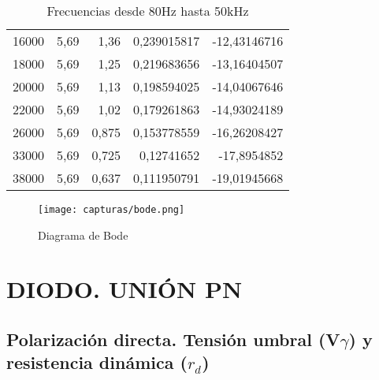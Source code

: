 \begin{itemize}
\begin{table}[htbp]
\begin{tabular}{rrrrr}
				16000 & 5,69  & 1,36  & 0,239015817 & -12,43146716 \\
				18000 & 5,69  & 1,25  & 0,219683656 & -13,16404507 \\
				20000 & 5,69  & 1,13  & 0,198594025 & -14,04067646 \\
				22000 & 5,69  & 1,02  & 0,179261863 & -14,93024189 \\
				26000 & 5,69  & 0,875 & 0,153778559 & -16,26208427 \\
				33000 & 5,69  & 0,725 & 0,12741652 & -17,8954852 \\
				38000 & 5,69  & 0,637 & 0,111950791 & -19,01945668 \\
			\end{tabular}%
			\caption{Frecuencias desde 80Hz hasta 50kHz}
			\label{tab:frecuencias}%
		\end{table}%
	
	\begin{figure}[H] %
		\centering
		\texttt{[image: capturas/bode.png]} 
		\caption{Diagrama de Bode}
		\label{fig:bode}
	\end{figure}
\end{itemize}

\section{DIODO. UNIÓN PN}

\subsection{Polarización directa. Tensión umbral (V$ \gamma $) y resistencia dinámica ($ r_{d} $)}

